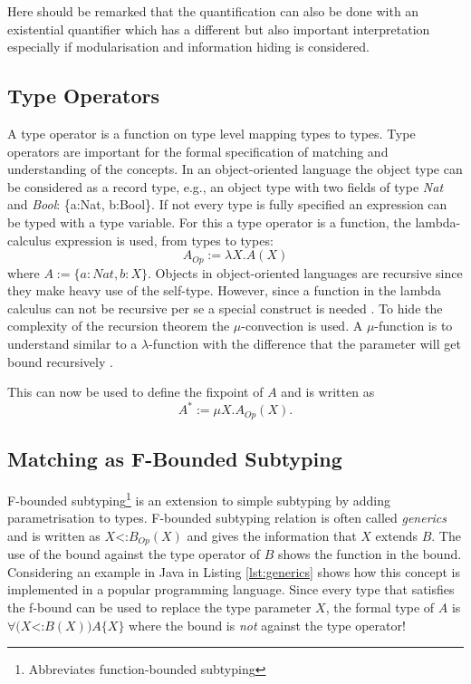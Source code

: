 Here should be remarked that the quantification can also be done with an
existential quantifier which has a different but also important
interpretation especially if modularisation and information hiding is
considered\cite{cameron_existential_2009,pierce_types_2002}.

\subsection{Type Operators}
A type operator is a function on type level mapping types to types. Type
operators are important for the formal specification of matching and
understanding of the concepts. In an object-oriented language the object
type can be considered as a record type, e.g., an object type with two
fields of type \emph{Nat} and \emph{Bool}: \{a:Nat, b:Bool\}. If not
every type is fully specified an expression can be typed with a type
variable. For this a type operator is a function, the lambda-calculus
expression is used, from types to types: \[A_{Op} := \lambda X.A(X)
\] where $A := \{a:Nat, b:X\}$. Objects in object-oriented languages
are recursive since they make heavy use of the self-type. However,
since a function in the lambda calculus can not be recursive per se
a special construct is needed \cite{gabriel_why_1988}. To hide the
complexity of the recursion theorem the $\mu$-convection is used. A
$\mu$-function is to understand similar to a $\lambda$-function
with the difference that the parameter will get bound recursively
\cite{pierce_types_2002,simons_theory_2002-3}.

This can now be used to define the fixpoint of $A$ and is written as \[A^*
:= \mu X.A_{Op}(X).\]


\subsection{Matching as F-Bounded Subtyping}
F-bounded subtyping\footnote{Abbreviates function-bounded subtyping}
is an extension to simple subtyping by adding parametrisation to
types. F-bounded subtyping relation is often called \emph{generics}
and is written as $X$<:$B_{Op}(X)$ and gives the information that $X$
extends $B$. The use of the bound against the type operator of $B$
shows the function in the bound. Considering an example in Java in
Listing \ref{lst:generics} shows how this concept is implemented in a popular
programming language. Since every type that satisfies the f-bound can
be used to replace the type parameter $X$, the formal type of $A$ is
$\forall(X$<:$B(X))A\{X\}$ where the bound is \emph{not} against the
type operator!

